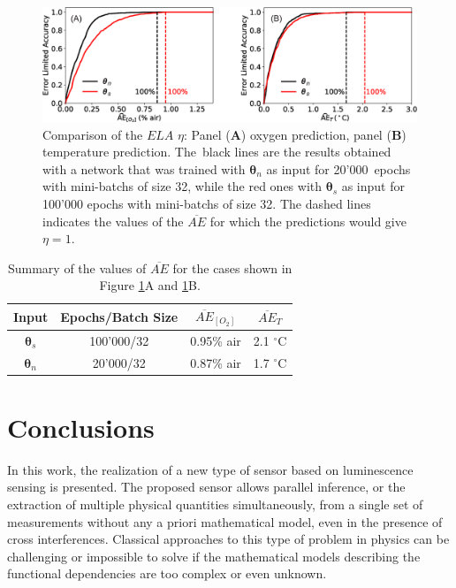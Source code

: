 \documentclass[sensors,article,accept,moreauthors,pdftex,10pt,a4paper]{Definitions/mdpi}
\theoremstyle{definition}
\begin{document}
\begin{figure}[H]
\centering
\includegraphics[width=14 cm]{ELA_comparison_O2_T.eps}
\caption{Comparison of the $ELA$ $\eta$: Panel (\textbf{A}) oxygen prediction, panel (\textbf{B}) temperature prediction. The~black lines are the results obtained with a network that was trained with ${\pmb \theta}_n$ as input for 20'000~epochs with mini-batchs of size 32, while the red ones with ${\pmb \theta}_s$ as input for 100'000 epochs with mini-batchs of size 32. The dashed lines indicates the values of the $\overline{AE}$ for which the predictions would give $\eta=1$.}
\label{fig:ELA_result_comparison}
\end{figure}

\begin{table}[H]
\centering
\caption {Summary of the values of $\overline{AE}$ for the cases shown in Figure \ref{fig:ELA_result_comparison}A and \ref{fig:ELA_result_comparison}B.}
\label{table:ela}
\begin{tabular}{ cccc}
\toprule
 \textbf{Input} & \textbf{Epochs/Batch Size} & \boldmath$\overline{AE}_{[O_2]}$ & \boldmath$\overline{AE}_{T}$  \\ 
\midrule
${\pmb \theta}_s$ & 100'000/32 & 0.95\% air & 2.1 $^\circ$C\\ 
${\pmb \theta}_n $ & 20'000/32 & 0.87\% air & 1.7 $^\circ$C\\ 
\bottomrule
\end{tabular}

\end{table}


\section{Conclusions}

In this work, the realization of a new type of sensor based on luminescence sensing is presented. The proposed sensor allows parallel inference, or the extraction of multiple physical quantities simultaneously, from a single set of measurements without any {a priori} mathematical model, even in the presence of cross interferences. Classical approaches to this type of problem in physics can be challenging or impossible to solve if the mathematical models describing the functional dependencies are too complex or even unknown.
\end{document}
